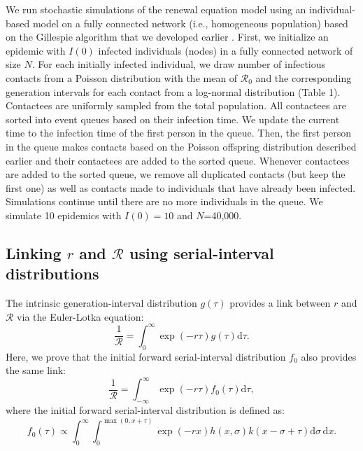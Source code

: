 \documentclass[12pt]{article}
\newcommand{\Rx}[1]{\ensuremath{{\mathcal R}_{#1}}\xspace}
\newcommand{\Ro}{\Rx{0}}
\newcommand{\RR}{\ensuremath{{\mathcal R}}\xspace}
\begin{document}
We run stochastic simulations of the renewal equation model using an individual-based model on a fully connected network (i.e., homogeneous population) based on the Gillespie algorithm that we developed earlier \citep{park2019inferring}.
First, we initialize an epidemic with $I(0)$ infected individuals (nodes) in a fully connected network of size $N$. 
For each initially infected individual, we draw number of infectious contacts from a Poisson distribution with the mean of \Ro and the corresponding generation intervals for each contact from a log-normal distribution (Table 1).
Contactees are uniformly sampled from the total population.
All contactees are sorted into event queues based on their infection time.
We update the current time to the infection time of the first person in the queue.
Then, the first person in the queue makes contacts based on the Poisson offspring distribution described earlier and their contactees are added to the sorted queue.
Whenever contactees are added to the sorted queue, we remove all duplicated contacts (but keep the first one) as well as contacts made to individuals that have already been infected.
Simulations continue until there are no more individuals in the queue.
We simulate 10 epidemics with $I(0)=10$ and $N$=40,000.

\subsection{Linking $r$ and \RR using serial-interval distributions}

The intrinsic generation-interval distribution $g(\tau)$ provides a link between $r$ and \RR via the Euler-Lotka equation:
\begin{equation}
\frac{1}{\RR} = \int_0^\infty \exp(-r\tau) g(\tau) \mathrm{d} \tau.
\end{equation}
Here, we prove that the initial forward serial-interval distribution $f_0$ also provides the same link:
\begin{equation}
\frac{1}{\RR} = \int_{-\infty}^\infty \exp(-r\tau) f_{0}(\tau) \mathrm{d} \tau,
\end{equation}
where the initial forward serial-interval distribution is defined as:
\begin{equation}
f_{0}(\tau) \propto \int_{0}^{\infty} \int_{0}^{\max(0,x+\tau)} \exp(-rx) h(x, \sigma) k(x-\sigma+\tau) \mathrm{d}\sigma\,\mathrm{d}x.
\end{equation}
\end{document}
